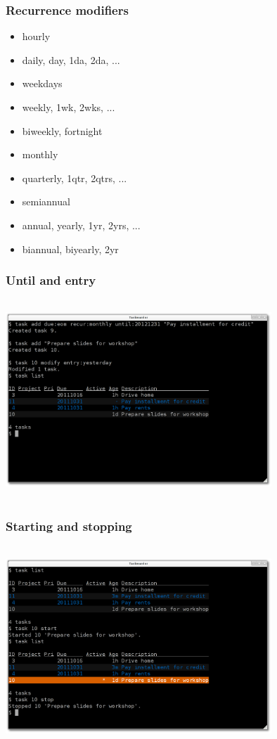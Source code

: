 \documentclass[t,handout]{beamer}
\begin{document}
\begin{frame}
\frametitle{Recurrence modifiers}
\begin{itemize}
\item hourly
\item daily, day, 1da, 2da, ...
\item weekdays
\item weekly, 1wk, 2wks, ...
\item biweekly, fortnight
\item monthly
\item quarterly, 1qtr, 2qtrs, ...
\item semiannual
\item annual, yearly, 1yr, 2yrs, ...
\item biannual, biyearly, 2yr
\end{itemize}
\end{frame}

\begin{frame}
\frametitle{Until and entry}
\begin{center}
\includegraphics[width=10cm,height=7.5cm]{until_and_entry.png}
\end{center}
\end{frame}

\begin{frame}
\frametitle{Starting and stopping}
\begin{center}
\includegraphics[width=10cm,height=7.5cm]{starting_and_stopping.png}
\end{center}
\end{frame}
\end{document}
